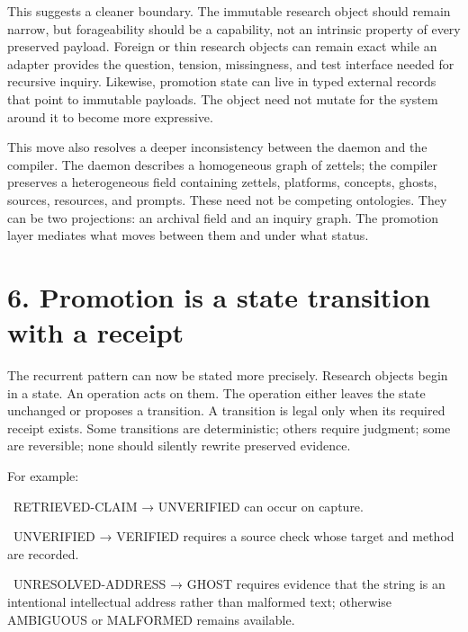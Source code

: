 \documentclass[11pt]{article}
\begin{document}
This suggests a cleaner boundary. The immutable research object should remain narrow, but forageability should be a capability, not an intrinsic property of every preserved payload. Foreign or thin research objects can remain exact while an adapter provides the question, tension, missingness, and test interface needed for recursive inquiry. Likewise, promotion state can live in typed external records that point to immutable payloads. The object need not mutate for the system around it to become more expressive.



This move also resolves a deeper inconsistency between the daemon and the compiler. The daemon describes a homogeneous graph of zettels; the compiler preserves a heterogeneous field containing zettels, platforms, concepts, ghosts, sources, resources, and prompts. These need not be competing ontologies. They can be two projections: an archival field and an inquiry graph. The promotion layer mediates what moves between them and under what status.



\section*{6. Promotion is a state transition with a receipt}



The recurrent pattern can now be stated more precisely. Research objects begin in a state. An operation acts on them. The operation either leaves the state unchanged or proposes a transition. A transition is legal only when its required receipt exists. Some transitions are deterministic; others require judgment; some are reversible; none should silently rewrite preserved evidence.



For example:



\noindent\textbullet\ RETRIEVED-CLAIM → UNVERIFIED can occur on capture.\par

\noindent\textbullet\ UNVERIFIED → VERIFIED requires a source check whose target and method are recorded.\par

\noindent\textbullet\ UNRESOLVED-ADDRESS → GHOST requires evidence that the string is an intentional intellectual address rather than malformed text; otherwise AMBIGUOUS or MALFORMED remains available.\par
\end{document}
